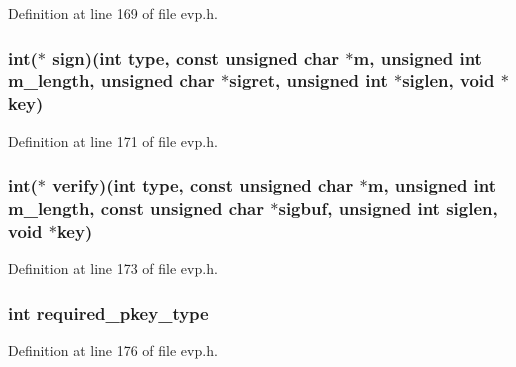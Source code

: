 Definition at line 169 of file evp.\+h.

\subsubsection[{\texorpdfstring{sign}{sign}}]{\setlength{\rightskip}{0pt plus 5cm}int($\ast$ sign)(int {\bf type}, const unsigned char $\ast$m, unsigned int m\+\_\+length, unsigned char $\ast$sigret, unsigned int $\ast$siglen, {\bf void} $\ast$key)}\hypertarget{structenv__md__st_a1ca226f483351fd092e4d5aa8bbb463d}{}\label{structenv__md__st_a1ca226f483351fd092e4d5aa8bbb463d}


Definition at line 171 of file evp.\+h.

\subsubsection[{\texorpdfstring{verify}{verify}}]{\setlength{\rightskip}{0pt plus 5cm}int($\ast$ verify)(int {\bf type}, const unsigned char $\ast$m, unsigned int m\+\_\+length, const unsigned char $\ast$sigbuf, unsigned int siglen, {\bf void} $\ast$key)}\hypertarget{structenv__md__st_a2ad5f09146f8777f4b33734059299241}{}\label{structenv__md__st_a2ad5f09146f8777f4b33734059299241}


Definition at line 173 of file evp.\+h.

\subsubsection[{\texorpdfstring{required\+\_\+pkey\+\_\+type}{required_pkey_type}}]{\setlength{\rightskip}{0pt plus 5cm}int required\+\_\+pkey\+\_\+type}\hypertarget{structenv__md__st_a21ae753f0351415b07b769dacb76860e}{}\label{structenv__md__st_a21ae753f0351415b07b769dacb76860e}


Definition at line 176 of file evp.\+h.

